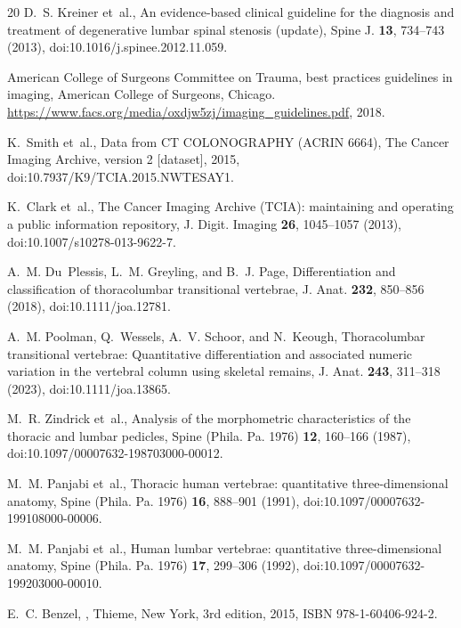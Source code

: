 \documentclass[aapm,mph,amsmath,amssymb,reprint]{revtex4-2}
\begin{document}
\begin{thebibliography}{20}
D.~S. Kreiner et~al.,
\newblock An evidence-based clinical guideline for the diagnosis and treatment of degenerative lumbar spinal stenosis (update),
\newblock Spine J. {\bf 13}, 734--743 (2013),
\newblock doi:10.1016/j.spinee.2012.11.059.

{American College of Surgeons Committee on Trauma},
 best practices guidelines in imaging,
\newblock American College of Surgeons, Chicago. \url{https://www.facs.org/media/oxdjw5zj/imaging_guidelines.pdf}, 2018.

K.~Smith et~al.,
\newblock Data from {CT COLONOGRAPHY} ({ACRIN} 6664),
\newblock The Cancer Imaging Archive, version 2 [dataset], 2015,
\newblock doi:10.7937/K9/TCIA.2015.NWTESAY1.

K.~Clark et~al.,
\newblock The {Cancer Imaging Archive} ({TCIA}): maintaining and operating a public information repository,
\newblock J. Digit. Imaging {\bf 26}, 1045--1057 (2013),
\newblock doi:10.1007/s10278-013-9622-7.

A.~M. Du~Plessis, L.~M. Greyling, and B.~J. Page,
\newblock Differentiation and classification of thoracolumbar transitional vertebrae,
\newblock J. Anat. {\bf 232}, 850--856 (2018),
\newblock doi:10.1111/joa.12781.

A.~M. Poolman, Q.~Wessels, A.~V. Schoor, and N.~Keough,
\newblock Thoracolumbar transitional vertebrae: Quantitative differentiation and associated numeric variation in the vertebral column using skeletal remains,
\newblock J. Anat. {\bf 243}, 311--318 (2023),
\newblock doi:10.1111/joa.13865.

M.~R. Zindrick et~al.,
\newblock Analysis of the morphometric characteristics of the thoracic and lumbar pedicles,
\newblock Spine (Phila. Pa. 1976) {\bf 12}, 160--166 (1987),
\newblock doi:10.1097/00007632-198703000-00012.

M.~M. Panjabi et~al.,
\newblock Thoracic human vertebrae: quantitative three-dimensional anatomy,
\newblock Spine (Phila. Pa. 1976) {\bf 16}, 888--901 (1991),
\newblock doi:10.1097/00007632-199108000-00006.

M.~M. Panjabi et~al.,
\newblock Human lumbar vertebrae: quantitative three-dimensional anatomy,
\newblock Spine (Phila. Pa. 1976) {\bf 17}, 299--306 (1992),
\newblock doi:10.1097/00007632-199203000-00010.

E.~C. Benzel,
,
\newblock Thieme, New York, 3rd edition, 2015,
\newblock ISBN 978-1-60406-924-2.


\end{thebibliography}
\end{document}
